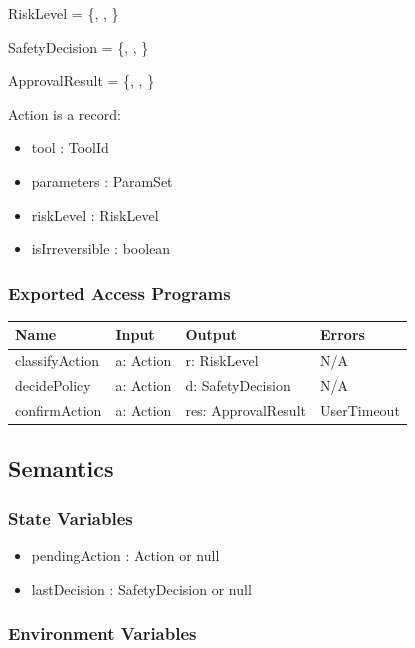 \documentclass[12pt, titlepage]{article}
\begin{document}
\noindent RiskLevel = \{, , \}

\noindent SafetyDecision = \{, , \}

\noindent ApprovalResult = \{, , \}

\noindent
Action is a record:
\begin{itemize}
  \item tool : ToolId
  \item parameters : ParamSet
  \item riskLevel : RiskLevel
  \item isIrreversible : boolean
\end{itemize}

\subsubsection{Exported Access Programs}

\begin{center}
\begin{tabular}{p{2.7cm} p{4cm} p{4cm} p{2.5cm}}
\hline
\textbf{Name} & \textbf{Input} & \textbf{Output} & \textbf{Errors} \\
\hline
classifyAction & a: Action & r: RiskLevel & N/A \\
decidePolicy & a: Action & d: SafetyDecision & N/A \\
confirmAction & a: Action & res: ApprovalResult & UserTimeout \\
\hline
\end{tabular}
\end{center}

\subsection{Semantics}

\subsubsection{State Variables}

\begin{itemize}
  \item pendingAction : Action or null
  \item lastDecision : SafetyDecision or null
\end{itemize}

\subsubsection{Environment Variables}
\end{document}
